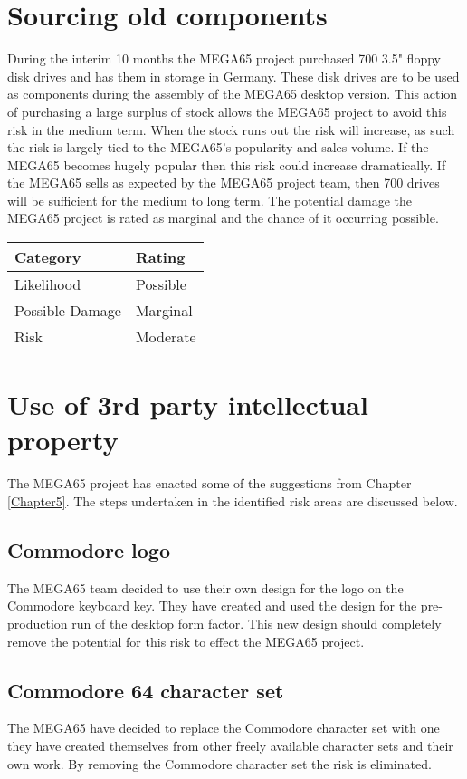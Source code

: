\section{Sourcing old components}
During the interim 10 months the MEGA65 project purchased 700 3.5" floppy disk drives and has them in storage in Germany. These disk drives are to be used as components during the assembly of the MEGA65 desktop version. This action of purchasing a large surplus of stock allows the MEGA65 project to avoid this risk in the medium term. When the stock runs out the risk will increase, as such the risk is largely tied to the MEGA65's popularity and sales volume. If the MEGA65 becomes hugely popular then this risk could increase dramatically. If the MEGA65 sells as expected by the MEGA65 project team, then 700 drives will be sufficient for the medium to long term. The potential damage the MEGA65 project is rated as marginal and the chance of it occurring possible. \\

\begin{tabular}{l|l} %
    	\textbf{Category} 	&	\textbf{Rating} \\
      \hline
     Likelihood			&	Possible \\
     Possible Damage 	& 	Marginal \\
     Risk 				&	Moderate		\\	
    \end{tabular}


\section{Use of 3rd party intellectual property}
The MEGA65 project has enacted some of the suggestions from Chapter \ref{Chapter5}. The steps undertaken in the identified risk areas are discussed below.

\subsection{Commodore logo}
The MEGA65 team decided to use their own design for the logo on the Commodore keyboard key. They have created and used the design for the pre-production run of the desktop form factor. This new design should completely remove the potential for this risk to effect the MEGA65 project.

\subsection{Commodore 64 character set}
The MEGA65 have decided to replace the Commodore character set with one they have created themselves from other freely available character sets and their own work. By removing the Commodore character set the risk is eliminated. 

